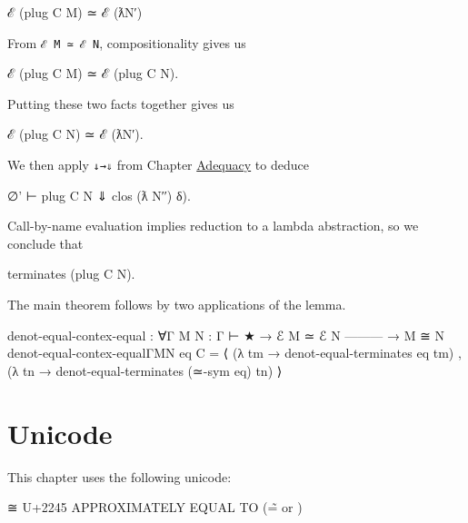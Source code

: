\begin{myDisplay}
ℰ (plug C M) ≃ ℰ (ƛN′)
\end{myDisplay}

From \texttt{ℰ\ M\ ≃\ ℰ\ N}, compositionality gives us

\begin{myDisplay}
ℰ (plug C M) ≃ ℰ (plug C N).
\end{myDisplay}

Putting these two facts together gives us

\begin{myDisplay}
ℰ (plug C N) ≃ ℰ (ƛN′).
\end{myDisplay}

We then apply \texttt{↓→⇓} from Chapter
\protect\hyperlink{Adequacy}{Adequacy} to deduce

\begin{myDisplay}
∅' ⊢ plug C N ⇓ clos (ƛ N′′) δ).
\end{myDisplay}

Call-by-name evaluation implies reduction to a lambda abstraction, so we
conclude that

\begin{myDisplay}
terminates (plug C N).
\end{myDisplay}

The main theorem follows by two applications of the lemma.

\begin{fence}
\begin{code}
denot-equal-contex-equal : ∀{Γ} {M N : Γ ⊢ ★}
  → ℰ M ≃ ℰ N
    ---------
  → M ≅ N
denot-equal-contex-equal{Γ}{M}{N} eq {C} =
   ⟨ (λ tm → denot-equal-terminates eq tm) ,
     (λ tn → denot-equal-terminates (≃-sym eq) tn) ⟩
\end{code}
\end{fence}

\hypertarget{unicode}{%
\section{Unicode}\label{unicode}}

This chapter uses the following unicode:

\begin{myDisplay}
≅  U+2245  APPROXIMATELY EQUAL TO (\~= or \cong)
\end{myDisplay}


